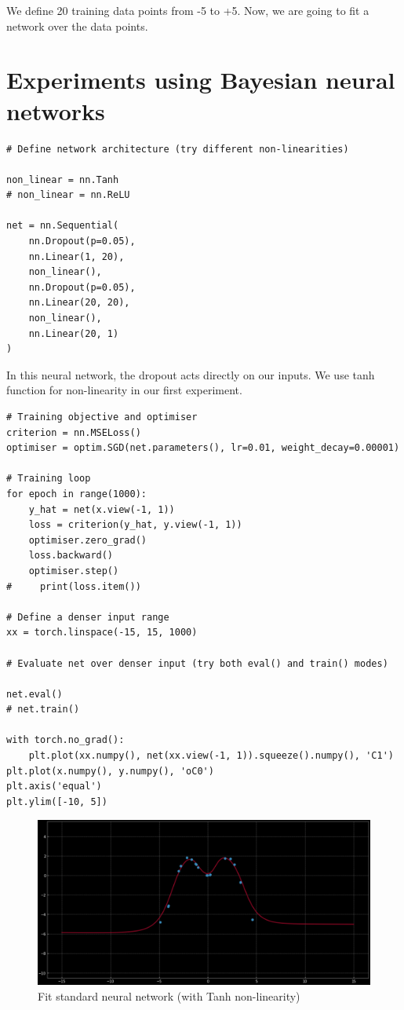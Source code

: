 We define 20 training data points from -5 to +5. Now, we are going to fit a network over the data points.

\section{Experiments using Bayesian neural networks}
\begin{verbatim}
# Define network architecture (try different non-linearities)

non_linear = nn.Tanh
# non_linear = nn.ReLU

net = nn.Sequential(
    nn.Dropout(p=0.05),
    nn.Linear(1, 20),
    non_linear(),
    nn.Dropout(p=0.05),
    nn.Linear(20, 20),
    non_linear(),
    nn.Linear(20, 1)
)
\end{verbatim}
In this neural network, the dropout acts directly on our inputs. We use tanh function for non-linearity in our first experiment.  

\begin{verbatim}
# Training objective and optimiser
criterion = nn.MSELoss()
optimiser = optim.SGD(net.parameters(), lr=0.01, weight_decay=0.00001)

# Training loop
for epoch in range(1000):
    y_hat = net(x.view(-1, 1))
    loss = criterion(y_hat, y.view(-1, 1))
    optimiser.zero_grad()
    loss.backward()
    optimiser.step()
#     print(loss.item())

# Define a denser input range
xx = torch.linspace(-15, 15, 1000)

# Evaluate net over denser input (try both eval() and train() modes)

net.eval()
# net.train()

with torch.no_grad():
    plt.plot(xx.numpy(), net(xx.view(-1, 1)).squeeze().numpy(), 'C1')
plt.plot(x.numpy(), y.numpy(), 'oC0')
plt.axis('equal')
plt.ylim([-10, 5])
\end{verbatim}

\begin{figure}[H]
    \centering
    \includegraphics[width=\textwidth]{labs/12/images/exp_2.png}
    \caption{Fit standard neural network (with Tanh non-linearity)}
    \label{fig:fit_standardNN}
\end{figure}

